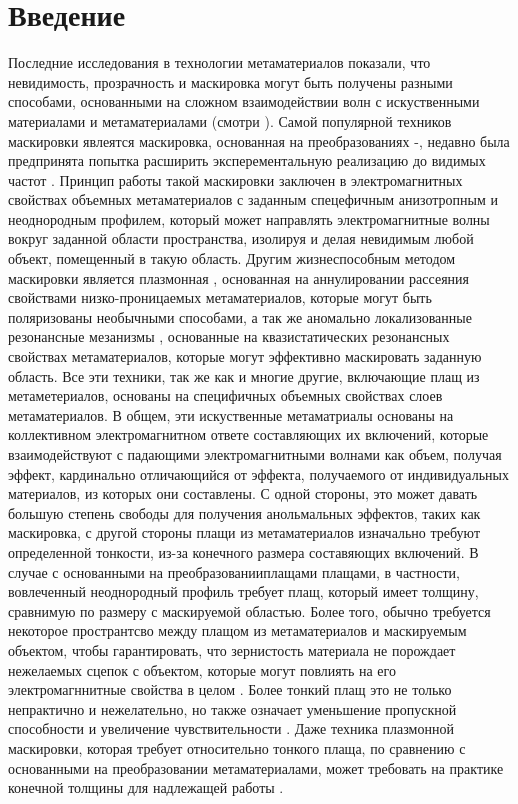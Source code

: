 \documentclass[12pt,a4paper]{article}
\begin{document}
\section{Введение}
Последние исследования в технологии метаматериалов показали, что невидимость,
прозрачность и маскировка могут быть получены разными способами, основанными на
сложном взаимодействии волн с искуственными материалами и метаматериалами (смотри 
\cite{1,2}). Самой популярной техников маскировки явлеятся маскировка, основанная на 
преобразованиях \cite{3}-\cite{6}, недавно была предпринята попытка расширить 
эксперементальную реализацию до видимых частот \cite{7}. Принцип работы такой 
маскировки заключен в электромагнитных свойствах объемных метаматериалов с заданным
спецефичным анизотропным и неоднородным профилем, который может направлять 
электромагнитные волны вокруг заданной области пространства, изолируя и делая
невидимым любой объект, помещенный в такую область. Другим жизнеспособным методом
маскировки является плазмонная \cite{8,9}, основанная на аннулировании рассеяния 
свойствами низко-проницаемых метаматериалов, которые могут быть поляризованы 
необычными способами, а так же аномально локализованные резонансные мезанизмы 
\cite{10}, основанные на квазистатических резонансных свойствах метаматериалов, 
которые могут эффективно маскировать заданную область. Все эти техники, так же как
и многие другие, включающие плащ из метаметериалов, основаны на специфичных объемных 
свойствах слоев метаматериалов.
В общем, эти искуственные метаматриалы основаны на коллективном электромагнитном
ответе составляющих их включений, которые взаимодействуют с падающими 
электромагнитными волнами как объем, получая эффект, кардинально отличающийся от
эффекта, получаемого от индивидуальных материалов, из которых они составлены.
С одной стороны, это может давать большую степень свободы для получения анольмальных
эффектов, таких как маскировка, с другой стороны плащи из метаматериалов изначально 
требуют определенной тонкости, из-за конечного размера составяющих включений. 
В случае с основанными на преобразованииплащами плащами, в частности, вовлеченный 
неоднородный профиль требует плащ, который имеет толщину, сравнимую по размеру с 
маскируемой областью. Более того, обычно требуется некоторое пространтсво между
плащом из метаматериалов и маскируемым объектом, чтобы гарантировать, что 
зернистость материала не порождает нежелаемых сцепок с объектом, которые могут 
повлиять на его электромагннитные свойства в целом \cite{11}. Более тонкий плащ
это не только непрактично и нежелательно, но также означает уменьшение пропускной
способности и увеличение чувствительности \cite{12}. Даже техника плазмонной 
маскировки, которая требует относительно тонкого плаща, по сравнению с основанными
на преобразовании метаматериалами, может требовать на практике конечной толщины
для надлежащей работы \cite{11,13}.
\end{document}
